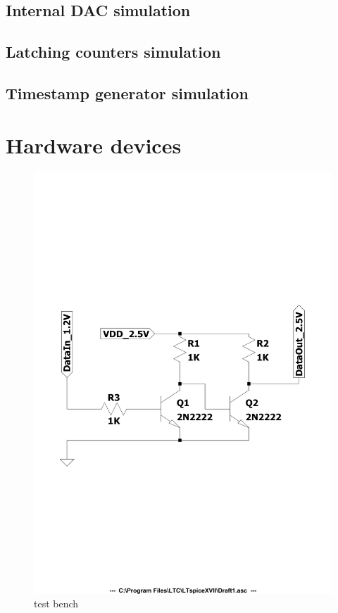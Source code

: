 \subsection{Internal DAC simulation}

\subsection{Latching counters simulation}

\subsection{Timestamp generator simulation}

\section{Hardware devices}\label{hardware}

\begin{figure}[H]
	\centering
	\includegraphics[width=0.7\linewidth]{IMG/ch4/DIAGRAM}
	\caption{test bench}
	\label{fig:diagram}
\end{figure}


